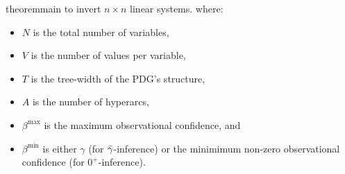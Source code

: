 \begin{linked}{theorem}{main}
{    to invert 
    $n{\times} n$
    linear systems. }
    where:
    \begin{itemize}[nosep,%
            ]
        \item $N$ is the total number of variables,
        \item $V$ is the number of values per variable,
        \item $T$ is the tree-width of the PDG's structure, 
        \item $A$ is the number of hyperarcs,
        \item $\beta^{\max}$ is the maximum observational confidence,
        and
        \item $\beta^{\min}$ is either $\gamma$ (for ${\bar\gamma}$-inference)
         or the minimimum non-zero observational confidence (for $0^+$-inference).
    \end{itemize}
\end{linked}

